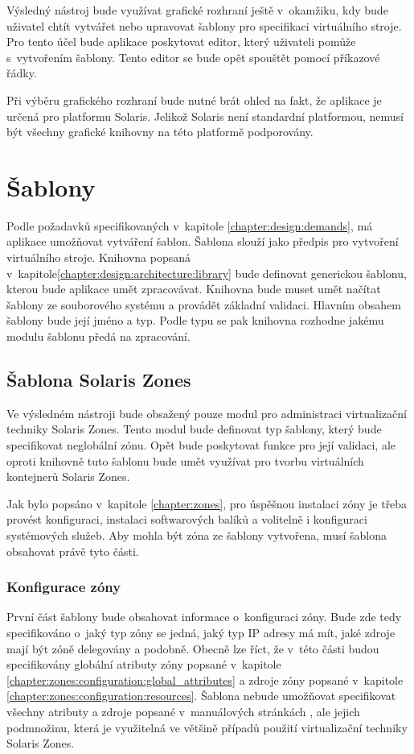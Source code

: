 Výsledný nástroj bude využívat grafické rozhraní ještě v~okamžiku, kdy bude uživatel chtít vytvářet nebo upravovat šablony pro
specifikaci virtuálního stroje. Pro tento účel bude aplikace poskytovat editor, který uživateli pomůže s~vytvořením šablony.
Tento editor se bude opět spouštět pomocí příkazové řádky.

Při výběru grafického rozhraní bude nutné brát ohled na fakt, že aplikace je určená pro platformu Solaris. Jelikož Solaris
není standardní platformou, nemusí být všechny grafické knihovny na této platformě podporovány.
\section{Šablony}
\label{chapter:design:templates}
Podle požadavků specifikovaných v~kapitole \ref{chapter:design:demands}, má aplikace umožňovat vytváření šablon. Šablona slouží
jako předpis pro vytvoření virtuálního stroje. Knihovna popsaná v~kapitole\ref{chapter:design:architecture:library} bude definovat 
generickou šablonu, kterou bude aplikace umět zpracovávat. Knihovna bude muset umět načítat šablony ze souborového systému
a provádět základní validaci. Hlavním obsahem šablony bude její jméno a typ. Podle typu se pak knihovna rozhodne
jakému modulu šablonu předá na zpracování.
\subsection{Šablona Solaris Zones}
\label{chapter:design:templates:zones}
Ve výsledném nástroji bude obsažený pouze modul pro administraci virtualizační techniky Solaris Zones. Tento modul bude
definovat typ šablony, který bude specifikovat neglobální zónu. Opět bude poskytovat funkce pro její validaci, ale oproti
knihovně tuto šablonu bude umět využívat pro tvorbu virtuálních kontejnerů Solaris Zones.

Jak bylo popsáno v~kapitole \ref{chapter:zones}, pro úspěšnou instalaci zóny je třeba provést konfiguraci, instalaci 
softwarových balíků a volitelně i konfiguraci systémových služeb. Aby mohla být zóna ze šablony vytvořena, musí šablona obsahovat
právě tyto části.
\subsubsection{Konfigurace zóny}
\label{chapter:design:templates:zones:configuration}
První část šablony bude obsahovat informace o~konfiguraci zóny. Bude zde tedy specifikováno o~jaký typ zóny se jedná,
jaký typ IP adresy má mít, jaké zdroje mají být zóně delegovány a podobně. Obecně lze říct, že v~této části budou specifikovány
globální atributy zóny popsané v~kapitole \ref{chapter:zones:configuration:global_attributes} a zdroje zóny popsané v~kapitole
\ref{chapter:zones:configuration:resources}. Šablona nebude umožňovat specifikovat všechny atributy a zdroje popsané
v~manuálových stránkách \cite{oracle:manpages:zonecfg}, ale jejich podmnožinu, která je využitelná ve většině případů použití virtualizační
techniky Solaris Zones.
